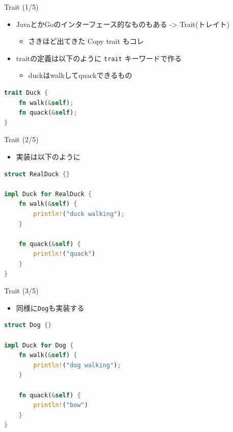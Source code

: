 \documentclass[cjk,dvipdfmx,10pt,compress,fragile%
hyperref={bookmarks=true,bookmarksnumbered=true,bookmarksopen=false,%
colorlinks=false,%
pdftitle={第 134 回 関西 Debian 勉強会},%
pdfauthor={小林},%
pdfsubject={資料},%
}]{beamer}
\begin{document}
\begin{frame}[t,fragile]{Trait (1/5)}
 \begin{itemize}
  \item JavaとかGoのインターフェース的なものもある -> Trait(トレイト)
	\begin{itemize}
	 \item さきほど出てきた Copy trait もコレ
	\end{itemize}
  \item traitの定義は以下のように \texttt{trait} キーワードで作る
	\begin{itemize}
	 \item duckはwalkしてquackできるもの
	\end{itemize}
 \end{itemize}
\begin{lstlisting}[language=Rust,style=boxed,style=colouredRust,basicstyle=\small\tt,lineskip=-2pt]
trait Duck {
    fn walk(&self);
    fn quack(&self);
}\end{lstlisting}
\end{frame}

\begin{frame}[t,fragile]{Trait (2/5)}
\begin{itemize}
 \item 実装は以下のように
\end{itemize}
\begin{lstlisting}[language=Rust,style=boxed,style=colouredRust,basicstyle=\small\tt,lineskip=-2pt]
struct RealDuck {}

impl Duck for RealDuck {
    fn walk(&self) {
        println!("duck walking");
    }

    fn quack(&self) {
        println!("quack")
    }
}\end{lstlisting}
\end{frame}

\begin{frame}[t,fragile]{Trait (3/5)}
\begin{itemize}
 \item 同様に\texttt{Dog}も実装する
\end{itemize}
\begin{lstlisting}[language=Rust,style=boxed,style=colouredRust,basicstyle=\small\tt,lineskip=-2pt]
struct Dog {}

impl Duck for Dog {
    fn walk(&self) {
        println!("dog walking");
    }

    fn quack(&self) {
        println!("bow")
    }
}\end{lstlisting}
\end{frame}
\end{document}
